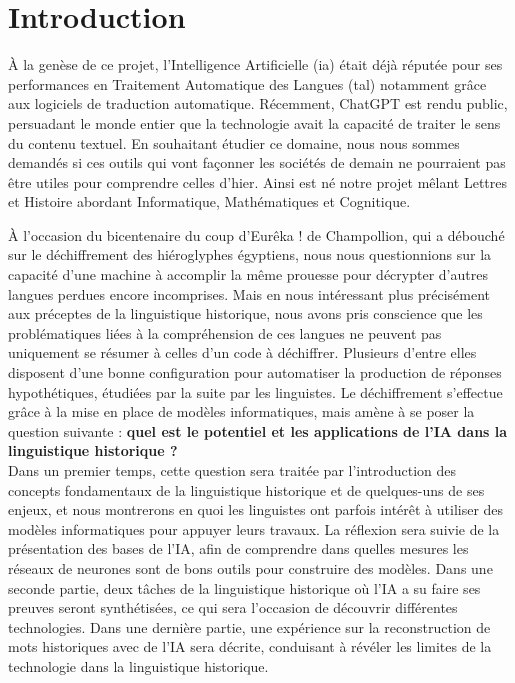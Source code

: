 \documentclass[12pt, twoside]{report}
\begin{document}
\tableofcontents
\listoffigures

\printglossary[title={Vocabulaire et Notations}, toctitle = {Vocabulaire et Notations}]

\chapter{Introduction}

À la genèse de ce projet, l'Intelligence Artificielle (\Gls{ia}) était déjà réputée pour ses performances en Traitement Automatique des Langues (\Gls{tal}) notamment grâce aux logiciels de traduction automatique. Récemment, ChatGPT \autocite{chatgpt} est rendu public, persuadant le monde entier que la technologie avait la capacité de traiter le sens du contenu textuel.  En souhaitant étudier ce domaine, nous nous sommes demandés si ces outils qui vont façonner les sociétés de demain ne pourraient pas être utiles pour comprendre celles d’hier. Ainsi est né notre projet mêlant Lettres et Histoire abordant Informatique, Mathématiques et Cognitique.

À l'occasion du bicentenaire du coup d'\og Eurêka !\fg{} de Champollion, qui a débouché sur le déchiffrement des hiéroglyphes égyptiens, nous nous questionnions sur la capacité d'une machine à accomplir la même prouesse pour décrypter d'autres langues perdues encore incomprises. Mais en nous intéressant plus précisément aux préceptes de la linguistique historique, nous avons pris conscience que les problématiques liées à la compréhension de ces langues ne peuvent pas uniquement se résumer à celles d’un code à déchiffrer. Plusieurs d’entre elles disposent d’une bonne configuration pour automatiser la production de réponses hypothétiques, étudiées par la suite par les linguistes. Le déchiffrement s’effectue grâce à la mise en place de modèles informatiques, mais amène à se poser la question suivante : \textbf{quel est le potentiel et les applications de l'IA dans la linguistique historique ?}\\

Dans un premier temps, cette question sera traitée par l’introduction des concepts fondamentaux de la linguistique historique et de quelques-uns de ses enjeux, et nous montrerons en quoi les linguistes ont parfois intérêt à utiliser des modèles informatiques pour appuyer leurs travaux. La réflexion sera suivie de la présentation des bases de l’IA, afin de comprendre dans quelles mesures les réseaux de neurones sont de bons outils pour construire des modèles. 
Dans une seconde partie, deux tâches de la linguistique historique où l’IA a su faire ses preuves seront synthétisées, ce qui sera l’occasion de découvrir différentes technologies.
Dans une dernière partie, une expérience sur la reconstruction de mots historiques avec de l’IA sera décrite, conduisant à révéler les limites de la technologie dans la linguistique historique.
\end{document}
